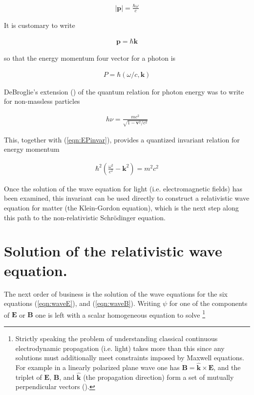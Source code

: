 \documentclass[]{eliblog}
\newcommand{\Abs}[1]{{\left\lvert{#1}\right\rvert}}
\newcommand{\BB}[0]{\mathbf{B}}
\newcommand{\BE}[0]{\mathbf{E}}
\newcommand{\Bk}[0]{\mathbf{k}}
\newcommand{\Bp}[0]{\mathbf{p}}
\newcommand{\Bv}[0]{\mathbf{v}}
\newcommand{\cross}[0]{\times}
\newcommand{\kcap}[0]{\hat{\Bk}}
\begin{document}
\begin{align}
\Abs{\Bp} = \frac{\hbar \omega}{c}
\end{align}

It is customary to write

\begin{align}
{\Bp} = \hbar \Bk
\end{align}

so that the energy momentum four vector for a photon is

\begin{align}
P = \hbar ( \omega/c, \Bk )
\end{align}

DeBroglie's extension (\cite{AFkracklauerDeBroglie}) of the quantum relation for photon energy was to write for non-massless particles

\begin{align}
h \nu = \frac{m c^2}{\sqrt{1 - \Bv^2/c^2}}
\end{align}

This, together with (\ref{eqn:EPinvar}), provides a quantized invariant relation for energy momentum

\begin{align}\label{eqn:DeBroglie}
\hbar^2 \left( \frac{\omega^2}{c^2} - \Bk^2 \right) = m^2 c^2
\end{align}

Once the solution of the wave equation for light (i.e. electromagnetic fields) has been examined, this invariant can be
used directly to construct a relativistic wave equation for matter (the Klein-Gordon equation), which is the next step along this 
path to the non-relativistic Schr\"{o}dinger equation.

\section{Solution of the relativistic wave equation.}

The next order of business is the solution of the wave equations for the six 
equations (\ref{eqn:waveE}), and (\ref{eqn:waveB}).  
Writing $\psi$ for one of the components of $\BE$ or $\BB$ one is left with a scalar homogeneous equation to solve
\footnote{Strictly speaking the problem of understanding classical continuous electrodynamic propagation (i.e. light) takes more than this since any solutions must additionally meet constraints imposed by Maxwell equations.  For example in a linearly polarized plane wave one has $\BB = \kcap \cross \BE$, and the triplet of $\BE$, $\BB$, and $\kcap$ (the propagation direction) form a set of mutually perpendicular vectors (\cite{jackson1975cewWave}).}
\end{document}
